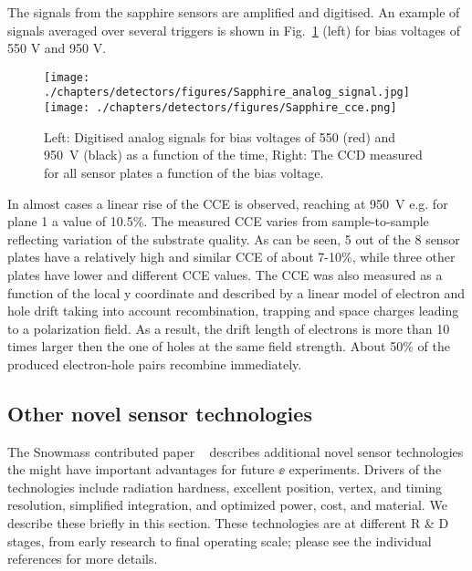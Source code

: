 The signals from the sapphire sensors are amplified and digitised. An example of signals averaged over several triggers is shown in Fig.~\ref{sapphire_analog_signal} (left) for bias voltages of 550 V and 950 V.
\begin{figure}[t]
\begin{center}
    \texttt{[image: ./chapters/detectors/figures/Sapphire\_analog\_signal.jpg]}
    \hfill
    \texttt{[image: ./chapters/detectors/figures/Sapphire\_cce.png]}
    \caption{Left: Digitised analog signals for bias voltages of 550 (red) and 950~V (black) as a function of the time, Right: The CCD measured for all sensor plates a function of the bias voltage.}
    \label{sapphire_analog_signal}
  \hspace{0.025\textwidth}
  \end{center}
\end{figure}

In almost cases a linear rise of the CCE is observed, reaching at 950~V e.g. for plane 1 a value of 10.5\%. The measured CCE varies from sample-to-sample reflecting variation of the substrate quality. As can be seen, 5 out of the 8 sensor plates have a relatively high and similar CCE of about 7-10\%, while three other plates have lower and different CCE values. 
The CCE was also measured as a function of the local y coordinate and described by a linear model of electron and hole drift taking into account recombination, trapping and space charges leading to a polarization field. As a result, the  drift length of electrons is more than 10 times larger then the one of holes at the same field strength. About 50\% of the produced electron-hole pairs recombine immediately. 




\subsection{Other novel sensor technologies}

The Snowmass contributed paper ~\cite{Hoeferkamp:2022qwg} describes additional
novel sensor technologies the might have important advantages for future 
$\ee$ experiments.
Drivers of the technologies include radiation hardness, excellent position, vertex, and timing resolution, simplified integration, and optimized power, cost, and material.  We describe these briefly in this section.  These technologies are at different R \& D stages, from early research to final operating scale; please see the individual references for more
details.




